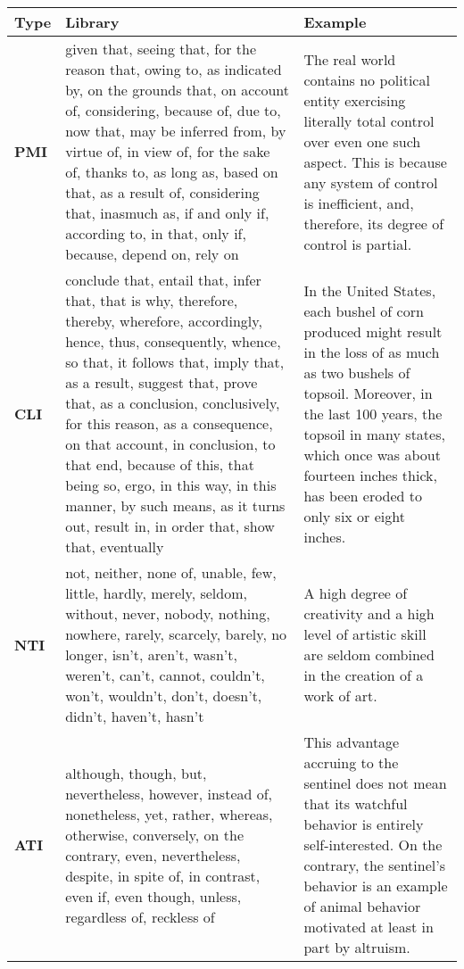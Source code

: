 \documentclass[11pt]{article}
\begin{document}
\begin{table*}
\small
\begin{tabular}{m{0.6cm}<{\centering}p{8cm}p{6cm}}
\toprule[1pt]
\textbf{Type} & \textbf{Library} & \textbf{Example}  \\ \midrule
\textbf{PMI} & given that, seeing that, for the reason that, owing to, as indicated by, on the grounds that, on account of, considering, because of, due to, now that, may be inferred from, by virtue of, in view of, for the sake of, thanks to, as long as, based on that, as a result of, considering that, inasmuch as, if and only if, according to, in that, only if, because, depend on, rely on & The real world contains no political entity exercising literally total control over even one such aspect. \colorbox{premisecolor}{This is because} any system of control is inefficient, and, therefore, its degree of control is partial. \\ \midrule

\textbf{CLI} & conclude that, entail that, infer that, that is why, therefore, thereby, wherefore, accordingly, hence, thus, consequently, whence, so that, it follows that, imply that, as a result, suggest that, prove that, as a conclusion, conclusively, for this reason, as a consequence, on that account, in conclusion, to that end, because of this, that being so, ergo, in this way, in this manner, by such means, as it turns out, result in, in order that, show that, eventually & In the United States, each bushel of corn produced might \colorbox{conclusioncolor}{result in} the loss of as much as two bushels of topsoil. Moreover, in the last 100 years, the topsoil in many states, which once was about fourteen inches thick, has been eroded to only six or eight inches. \\ \midrule

\textbf{NTI} & not, neither, none of, unable, few, little, hardly, merely, seldom, without, never, nobody, nothing, nowhere, rarely, scarcely, barely, no longer, isn't, aren't, wasn't, weren't, can't, cannot, couldn't, won't, wouldn't, don't, doesn't, didn't, haven't, hasn't & A high degree of creativity and a high level of artistic skill are \colorbox{negativecolor}{seldom} combined in the creation of a work of art. \\ \midrule

\textbf{ATI} & although, though, but, nevertheless, however, instead of, nonetheless, yet, rather, whereas, otherwise, conversely, on the contrary, even, nevertheless, despite, in spite of, in contrast, even if, even though, unless, regardless of, reckless of & This advantage accruing to the sentinel does not mean that its watchful behavior is entirely self-interested. \colorbox{adversativecolor}{On the contrary}, the sentinel's behavior is an example of animal behavior motivated at least in part by altruism. \\ \midrule


\end{tabular}
\end{table*}
\end{document}
